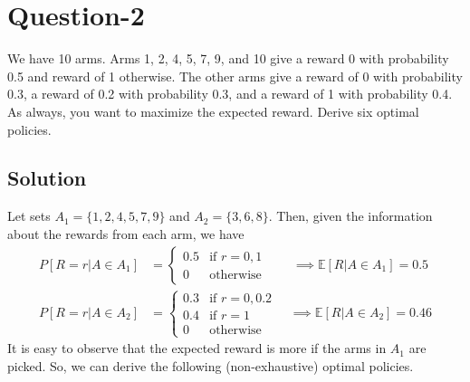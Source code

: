 \documentclass[11pt]{article}
\begin{document}
    \section*{Question-2}
    We have 10 arms. Arms 1, 2, 4, 5, 7, 9, and 10 give a reward 0 with probability 0.5
    and reward of 1 otherwise. The other arms give a reward of 0 with probability 0.3, a reward of
    0.2 with probability 0.3, and a reward of 1 with probability 0.4. As always, you want to
    maximize the expected reward. Derive six optimal policies.

    \subsection*{Solution}
    Let sets $A_{1} = \{ 1, 2, 4, 5, 7, 9 \}$ and $A_{2} = \{ 3, 6, 8 \}$. Then, given the
    information about the rewards from each arm, we have
    \begin{align*}
        P[R = r | A \in A_{1}] &= \begin{cases}
            0.5 & \text{if } r = 0, 1 \\
            0 & \text{otherwise}
        \end{cases}
        \qquad \implies \mathbb{E}[R | A \in A_{1}] = 0.5 \\
        P[R = r | A \in A_{2}] &= \begin{cases}
            0.3 & \text{if } r = 0, 0.2 \\
            0.4 & \text{if } r = 1 \\
            0 & \text{otherwise}
        \end{cases}
        \quad \implies \mathbb{E}[R | A \in A_{2}] = 0.46
    \end{align*}
    It is easy to observe that the expected reward is more if the arms in $A_{1}$ are picked.
    So, we can derive the following (non-exhaustive) optimal policies.
\end{document}
